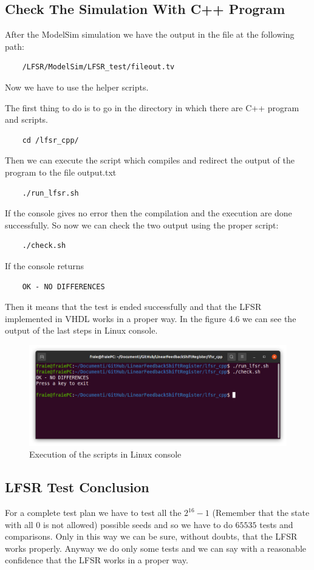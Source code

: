 \documentclass[a4paper]{report}
\begin{document}
\subsection{Check The Simulation With C++ Program}
After the ModelSim simulation we have the output in the file at the following path:
\begin{Verbatim}
	/LFSR/ModelSim/LFSR_test/fileout.tv
\end{Verbatim}
Now we have to use the helper scripts.

\noindent The first thing to do is to go in the directory in which there are C++ program and scripts.
\begin{Verbatim}
	cd /lfsr_cpp/
\end{Verbatim}
Then we can execute the script which compiles and redirect the output of the program to the file output.txt
\begin{Verbatim}
	./run_lfsr.sh
\end{Verbatim}
If the console gives no error then the compilation and the execution are done successfully. So now we can check the two output using the proper script:
\begin{Verbatim}
	./check.sh
\end{Verbatim}
If the console returns
\begin{Verbatim}
	OK - NO DIFFERENCES
\end{Verbatim}
Then it means that the test is ended successfully and that the LFSR implemented in VHDL works in a proper way.
In the figure 4.6 we can see the output of the last steps in Linux console.
\begin{figure}[htpb]
	\centering
	\includegraphics[scale=0.4]{img/tb/linuxConsoleExecution.png}
	\caption{Execution of the scripts in Linux console}
\end{figure}
\subsection{LFSR Test Conclusion}
For a complete test plan we have to test all the $2^{16}-1$ (Remember that the state with all 0 is not allowed) possible seeds and so we have to do $65535$ tests and comparisons. Only in this way we can be sure, without doubts, that the LFSR works properly. Anyway we do only some tests and we can say with a reasonable confidence that the LFSR works in a proper way.
\end{document}
